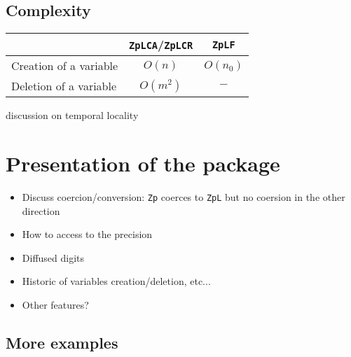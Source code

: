 \documentclass[sigconf]{acmart}
\newcommand{\ZpL}{\texttt{ZpL}\xspace}
\newcommand{\ZpLCA}{\texttt{ZpLCA}\xspace}
\newcommand{\ZpLCR}{\texttt{ZpLCR}\xspace}
\newcommand{\ZpLF}{\texttt{ZpLF}\xspace}
\theoremstyle{definition}
\begin{document}
\subsection{Complexity}

\begin{tabular}{l|c|c|}
& \ZpLCA/\ZpLCR & \ZpLF \\
\hline
Creation of a variable & $O(n)$ & $O(n_0)$ \\
\hline
Deletion of a variable & $O(m^2)$ & $-$ \\
\hline
\end{tabular}

discussion on temporal locality

\section{Presentation of the package}

\begin{itemize}
\item Discuss coercion/conversion: \texttt{Zp} coerces to \ZpL but no coersion
in the other direction
\item How to access to the precision
\item Diffused digits
\item Historic of variables creation/deletion, etc...
\item Other features?
\end{itemize}

\subsection{More examples}
\end{document}
